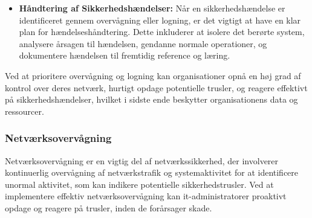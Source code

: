\begin{itemize}
	\item \textbf{Håndtering af Sikkerhedshændelser:} Når en sikkerhedshændelse er identificeret gennem overvågning eller logning, er det vigtigt at have en klar plan for hændelseshåndtering. Dette inkluderer at isolere det berørte system, analysere årsagen til hændelsen, gendanne normale operationer, og dokumentere hændelsen til fremtidig reference og læring.
	
\end{itemize}
\noindent
Ved at prioritere overvågning og logning kan organisationer opnå en høj grad af kontrol over deres netværk, hurtigt opdage potentielle trusler, og reagere effektivt på sikkerhedshændelser, hvilket i sidste ende beskytter organisationens data og ressourcer.


\subsubsection{Netværksovervågning}
Netværksovervågning er en vigtig del af netværkssikkerhed, der involverer kontinuerlig overvågning af netværkstrafik og systemaktivitet for at identificere unormal aktivitet, som kan indikere potentielle sikkerhedstrusler. Ved at implementere effektiv netværksovervågning kan it-administratorer proaktivt opdage og reagere på trusler, inden de forårsager skade.


